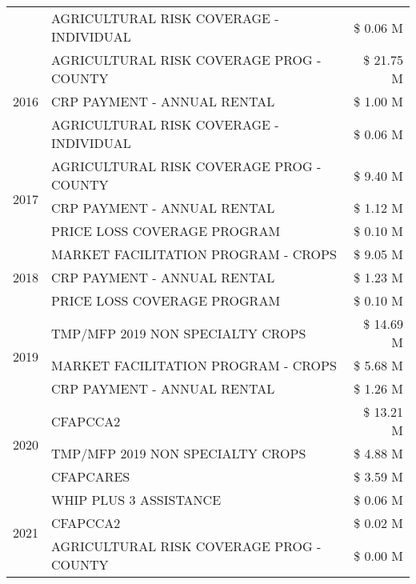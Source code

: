 \begin{tabular}{llr}
 & AGRICULTURAL RISK COVERAGE - INDIVIDUAL & \$ 0.06 M \\
\cline{1-3}
\multirow[t]{3}{*}{2016} & AGRICULTURAL RISK COVERAGE PROG - COUNTY      & \$ 21.75 M \\
 & CRP PAYMENT - ANNUAL RENTAL                   & \$ 1.00 M \\
 & AGRICULTURAL RISK COVERAGE - INDIVIDUAL       & \$ 0.06 M \\
\cline{1-3}
\multirow[t]{3}{*}{2017} & AGRICULTURAL RISK COVERAGE PROG - COUNTY & \$ 9.40 M \\
 & CRP PAYMENT - ANNUAL RENTAL & \$ 1.12 M \\
 & PRICE LOSS COVERAGE PROGRAM & \$ 0.10 M \\
\cline{1-3}
\multirow[t]{3}{*}{2018} & MARKET FACILITATION PROGRAM - CROPS & \$ 9.05 M \\
 & CRP PAYMENT - ANNUAL RENTAL & \$ 1.23 M \\
 & PRICE LOSS COVERAGE PROGRAM & \$ 0.10 M \\
\cline{1-3}
\multirow[t]{3}{*}{2019} & TMP/MFP 2019 NON SPECIALTY CROPS & \$ 14.69 M \\
 & MARKET FACILITATION PROGRAM - CROPS & \$ 5.68 M \\
 & CRP PAYMENT - ANNUAL RENTAL & \$ 1.26 M \\
\cline{1-3}
\multirow[t]{3}{*}{2020} & CFAPCCA2 & \$ 13.21 M \\
 & TMP/MFP 2019 NON SPECIALTY CROPS & \$ 4.88 M \\
 & CFAPCARES & \$ 3.59 M \\
\cline{1-3}
\multirow[t]{3}{*}{2021} & WHIP PLUS 3 ASSISTANCE & \$ 0.06 M \\
 & CFAPCCA2 & \$ 0.02 M \\
 & AGRICULTURAL RISK COVERAGE PROG - COUNTY & \$ 0.00 M \\
\cline{1-3}
\bottomrule
\end{tabular}
